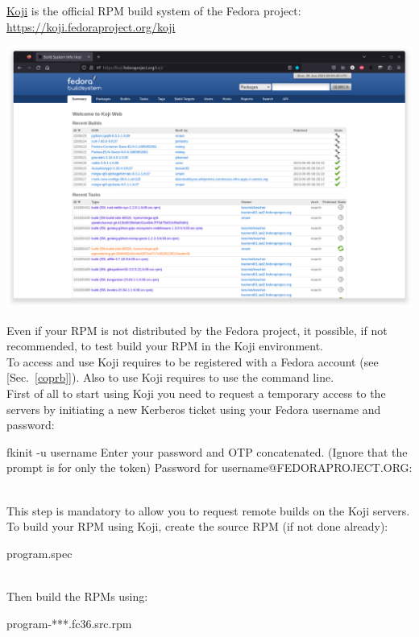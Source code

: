 \href{https://fedoraproject.org/wiki/Koji}{Koji} is the official RPM build system of the Fedora project: \href{https://koji.fedoraproject.org/koji}{https://koji.fedoraproject.org/koji}
\begin{center}
\includegraphics[width=1.0\textwidth,keepaspectratio=true,draft=\ddst]{img/rpms/koji.eps}
\end{center}
Even if your RPM is not distributed by the Fedora project, it possible, if not recommended, to test build your RPM in the Koji environment. \\
To access and use Koji requires to be registered with a Fedora account (see [Sec.~\ref{coprb}]). 
Also to use Koji requires to use the command line. \\[0.25cm]
First of all to start using Koji you need to request a temporary access to the servers by initiating a new Kerberos ticket using your Fedora username and password:
\begin{script}
\fprompt{~} fkinit -u username
Enter your password and OTP concatenated.
(Ignore that the prompt is for only the token)
Password for username@FEDORAPROJECT.ORG: 
\fprompt{~} 
\end{script}
\\[-0.5cm]
\noindent This step is mandatory to allow you to request remote builds on the Koji servers.
\newpage
\noindent To build your RPM using Koji, create the source RPM (if not done already):
\begin{script}
\fprompt{~}   program.spec
\end{script}
\\[-0.75cm]
\noindent Then build the RPMs using:
\begin{script}
\fprompt{~}    program-***.fc36.src.rpm
\end{script}
